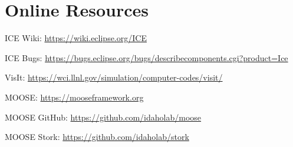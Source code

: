 \chapter{Online Resources}
\label{sec:resources}

ICE Wiki: \url{https://wiki.eclipse.org/ICE}

\noindent ICE Bugs: \url{https://bugs.eclipse.org/bugs/describecomponents.cgi?product=Ice}

\noindent VisIt: \url{https://wci.llnl.gov/simulation/computer-codes/visit/}

\noindent MOOSE: \url{https://mooseframework.org}

\noindent MOOSE GitHub: \url{https://github.com/idaholab/moose}

\noindent MOOSE Stork: \url{https://github.com/idaholab/stork}